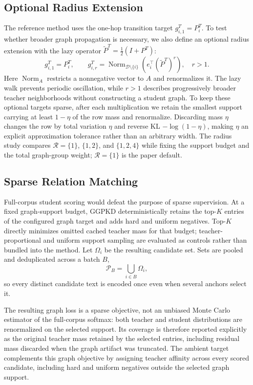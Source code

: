 \subsection{Optional Radius Extension}

The reference method uses the one-hop transition target $g^T_{i,1}=P_i^T$. To test whether broader graph propagation is necessary, we also define an optional radius extension with the lazy operator $\widetilde P^T=\tfrac12(I+P^T)$:
\begin{equation}
g^T_{i,1}=P_i^T,
\qquad
g^T_{i,r}
=\operatorname{Norm}_{\mathcal D\setminus\{i\}}
\!\left(e_i^\top(\widetilde P^T)^r\right),
\quad r>1.
\label{eq:diffusion-targets}
\end{equation}
Here $\operatorname{Norm}_A$ restricts a nonnegative vector to $A$ and renormalizes it. The lazy walk prevents periodic oscillation, while $r>1$ describes progressively broader teacher neighborhoods without constructing a student graph. To keep these optional targets sparse, after each multiplication we retain the smallest support carrying at least $1-\eta$ of the row mass and renormalize. Discarding mass $\eta$ changes the row by total variation $\eta$ and reverse KL $-\log(1-\eta)$, making $\eta$ an explicit approximation tolerance rather than an arbitrary width. The radius study compares $\mathcal R=\{1\}$, $\{1,2\}$, and $\{1,2,4\}$ while fixing the support budget and the total graph-group weight; $\mathcal R=\{1\}$ is the paper default.

\subsection{Sparse Relation Matching}
\label{sec:candidates}

Full-corpus student scoring would defeat the purpose of sparse supervision. At a fixed graph-support budget, GGPKD deterministically retains the top-$K$ entries of the configured graph target and adds hard and uniform negatives. Top-$K$ directly minimizes omitted cached teacher mass for that budget; teacher-proportional and uniform support sampling are evaluated as controls rather than bundled into the method. Let $\Omega_i$ be the resulting candidate set. Sets are pooled and deduplicated across a batch $B$,
\begin{equation}
\mathcal P_B=\bigcup_{i\in B}\Omega_i,
\end{equation}
so every distinct candidate text is encoded once even when several anchors select it.

The resulting graph loss is a sparse objective, not an unbiased Monte Carlo estimator of the full-corpus softmax: both teacher and student distributions are renormalized on the selected support. Its coverage is therefore reported explicitly as the original teacher mass retained by the selected entries, including residual mass discarded when the graph artifact was truncated. The ambient target complements this graph objective by assigning teacher affinity across every scored candidate, including hard and uniform negatives outside the selected graph support.


